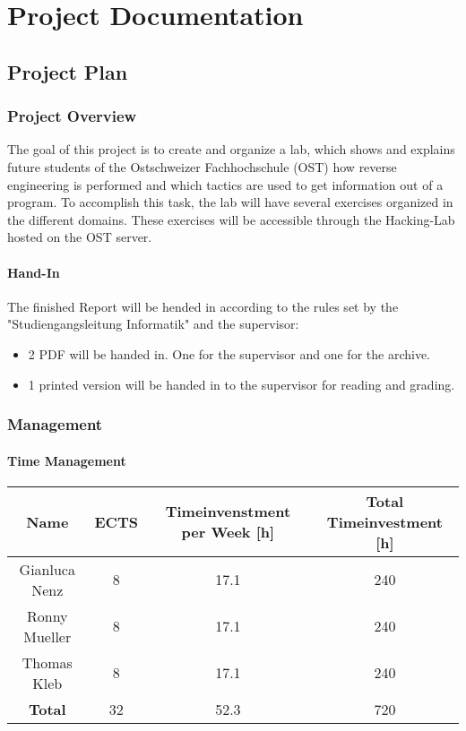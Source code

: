 \chapter{Project Documentation}
\section{Project Plan}
\subsection{Project Overview}
The goal of this project is to create and organize a lab, which shows and explains future students of the Ostschweizer Fachhochschule (OST) how reverse engineering is performed and which tactics are used to get information out of a program. To accomplish this task, the lab will have several exercises organized in the different domains. These exercises will be accessible through the Hacking-Lab hosted on the OST server. 

\subsubsection*{Hand-In}
The finished Report will be hended in according to the rules set by the "Studiengangsleitung Informatik" and the supervisor:
\begin{itemize}
    \item 2 PDF will be handed in. One for the supervisor and one for the archive.
    \item 1 printed version will be handed in to the supervisor for reading and grading.
\end{itemize}

\subsection{Management}
\subsubsection*{Time Management}

\begin{center}
    \begin{tabular}{||c c c c||} 
     \hline
      Name & ECTS & Timeinvenstment per Week [h] & Total Timeinvestment [h]\\ [0.5ex] 
     \hline\hline
     Gianluca Nenz & 8 & 17.1 & 240 \\ 
     \hline
     Ronny Mueller & 8 & 17.1 & 240 \\
     \hline
     Thomas Kleb & 8 & 17.1 & 240 \\ 
     \hline
     \textbf{Total} & 32 & 52.3 & 720 \\[1ex] 
     \hline
    \end{tabular}
    \end{center}
